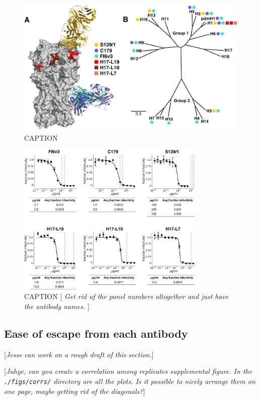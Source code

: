 \documentclass[11pt]{article}
\newcommand{\comment}[1]{{\color{red}[\textsl{#1}]}}
\begin{document}
\begin{figure}
\centerline{\includegraphics[width=\textwidth]{figs/antibody_summary_fig/Ab_summary.pdf}}
\caption{\label{fig:antibody_summary}
CAPTION
}
\end{figure}


\begin{figure}
\centerline{\includegraphics[width=0.8\textwidth]{figs/neutralization_curves/WT_neutralization_curves.pdf}}
\caption{\label{fig:neutcurves}
CAPTION
\comment{
Get rid of the panel numbers altogether and just have the antibody names.
}
}
\end{figure}

\subsection*{Ease of escape from each antibody}
\comment{Jesse can work on a rough draft of this section.}

\comment{Juhye, can you create a correlation among replicates supplemental figure. In the \texttt{./figs/corrs/} directory are all the plots. Is it possible to nicely arrange them on one page, maybe getting rid of the diagonals?}
\end{document}
